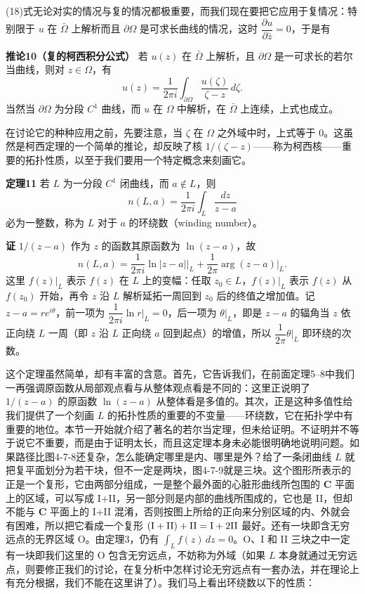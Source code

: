 (18)式无论对实的情况与复的情况都极重要，而我们现在要把它应用于复情况：特别限于 $u$ 在 $\bar\Omega$ 上解析而且 $\partial\Omega$ 是可求长曲线的情况，这时 $\dfrac{\partial u}{\partial\bar z}=0$，于是有

\noindent\textbf{推论10（复的柯西积分公式）}
若 $u(z)$ 在 $\bar\Omega$ 上解析，且 $\partial\Omega$ 是一可求长的若尔当曲线，则对 $z\in\Omega$，有
\begin{equation}
 u(z)=\frac1{2\pi i}\int_{\partial\Omega}\frac{u(\zeta)}{\zeta-z}\,d\zeta.
 \tag{19}
\end{equation}
当然当 $\partial\Omega$ 为分段 $C^1$ 曲线，而 $u$ 在 $\Omega$ 中解析，在 $\bar\Omega$ 上连续，上式也成立。

在讨论它的种种应用之前，先要注意，当 $\zeta$ 在 $\Omega$ 之外域中时，上式等于 0。这虽然是柯西定理的一个简单的推论，却反映了核 $1/(\zeta-z)$——称为柯西核——重要的拓扑性质，以至于我们要用一个特定概念来刻画它。

\noindent\textbf{定理11}
若 $L$ 为一分段 $C^1$ 闭曲线，而 $a\notin L$，则
\begin{equation}
 n(L,a)=\frac1{2\pi i}\int_L\frac{dz}{z-a}
 \tag{20}
\end{equation}
必为一整数，称为 $L$ 对于 $a$ 的环绕数（winding number）。

\noindent\textbf{证}
$1/(z-a)$ 作为 $z$ 的函数其原函数为 $\ln(z-a)$，故
\[
 n(L,a)=\frac1{2\pi i}\ln|z-a|\Big|_L+
 \frac1{2\pi}\arg(z-a)\Big|_L.
\]
这里 $f(z)|_L$ 表示 $f(z)$ 在 $L$ 上的变幅：任取 $z_0\in L$，$f(z)|_L$ 表示 $f(z)$ 从 $f(z_0)$ 开始，再令 $z$ 沿 $L$ 解析延拓一周回到 $z_0$ 后的终值之增加值。记 $z-a=re^{i\theta}$，前一项为 $\dfrac1{2\pi i}\ln r\big|_L=0$，后一项为 $\theta\big|_L$，即是 $z-a$ 的辐角当 $z$ 依正向绕 $L$ 一周（即 $z$ 沿 $L$ 正向绕 $a$ 回到起点）的增值，所以 $\dfrac1{2\pi}\theta\big|_L$ 即环绕的次数。

这个定理虽然简单，却有丰富的含意。首先，它告诉我们，在前面定理5--8中我们一再强调原函数从局部观点看与从整体观点看是不同的：这里正说明了 $1/(z-a)$ 的原函数 $\ln(z-a)$ 从整体看是多值的。其次，正是这种多值性给我们提供了一个刻画 $L$ 的拓扑性质的重要的不变量——环绕数，它在拓扑学中有重要的地位。本节一开始就介绍了著名的若尔当定理，但未给证明。不证明并不等于说它不重要，而是由于证明太长，而且这定理本身未必能很明确地说明问题。如果路径比图4-7-8还复杂，怎么能确定哪里是内、哪里是外？给了一条闭曲线 $L$ 就把复平面划分为若干块，但不一定是两块，图4-7-9就是三块。这个图形所表示的正是一个复形，它由两部分组成，一是整个最外面的心脏形曲线所包围的 $\mathbf C$ 平面上的区域，可以写成 I+II，另一部分则是内部的曲线所围成的，它也是 II，但却不能与 $\mathbf C$ 平面上的 I+II 混淆，否则按图上所给的正向来分别区域的内、外就会有困难，所以把它看成一个复形 $({\rm I}+{\rm II})+{\rm II}={\rm I}+2{\rm II}$ 最好。还有一块即含无穷远点的无界区域 O。由定理3，仍有 $\int_Lf(z)\,dz=0$。O、I 和 II 三块之中一定有一块即我们这里的 O 包含无穷远点，不妨称为外域（如果 $L$ 本身就通过无穷远点，则要修正我们的讨论，在复分析中怎样讨论无穷远点有一套办法，并在理论上有充分根据，我们不能在这里讲了）。我们马上看出环绕数以下的性质：


